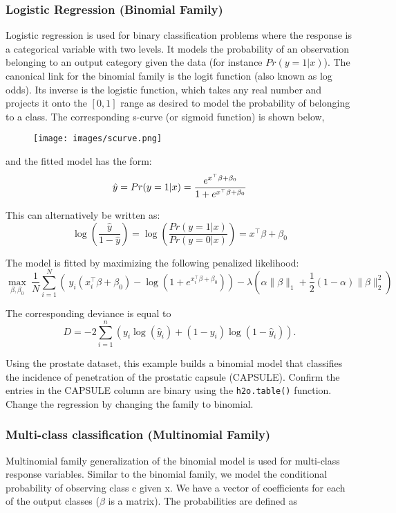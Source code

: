 \subsubsection{Logistic Regression (Binomial Family)}
Logistic regression is used for binary classification problems where the response is a categorical variable with two
levels. It models the probability of an observation belonging to an output category given the data (for instance $ Pr(y = 1|x)$).
The canonical link for the binomial family is the logit function (also known as log odds). Its inverse is the logistic function, which takes any real number and projects it onto the $[0,1]$ range as desired to model the probability of belonging to a class. The corresponding s-curve (or sigmoid function) is shown below,

\begin{figure}[h]
\centering
\texttt{[image: images/scurve.png]}
\end{figure}

and the fitted model has the form:
$$ \hat{y} = Pr(y = 1|x) = {e^{x^{\top}\beta + \beta_0} \over 1 + e^{x^{\top} \beta + \beta_0} }$$

This can alternatively be written as: 
$$  \log \left( \frac{\hat{y}}{ 1- \hat{y} } \right)  = \log \left(  \frac{Pr(y=1|x)}{Pr(y=0|x)}   \right) = x^{\top} \beta + \beta_0$$

The model is fitted by maximizing the following penalized likelihood: 
$$  \max_{\beta,\beta_0} \  \frac{1}{N} \sum_{i=1}^{N} \left( \ y_i (x_i^{\top}\beta  + \beta_0) - \log (1 + e^{x_i^{\top}\beta  + \beta_0} ) \right)  - \lambda \left( \alpha \|\beta \|_1 +  \frac{1}{2}(1- \alpha)  \| \beta \|_2^2 \right)$$

The corresponding deviance is equal to 
$$D = -2\sum_{i=1}^{n} \left(y_i \log(\hat{y}_i) + (1 - y_i)\log(1-\hat{y}_i)  \right).$$



Using the prostate dataset, this example builds a binomial model that classifies the incidence of penetration of the prostatic
capsule (CAPSULE). Confirm the entries in the CAPSULE column are binary using the \texttt{h2o.table()}
function. Change the regression by changing the family to binomial.

\waterExampleInR



\subsubsection{Multi-class classification (Multinomial Family)}
Multinomial family generalization of the binomial model is used for multi-class response variables. Similar to the
binomial family, we model the conditional probability of observing class c given x. We have a vector of coefficients
for each of the output classes ($\beta$ is a matrix). The probabilities are defined as

